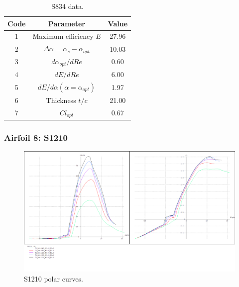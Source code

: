 \documentclass[../TFG_Annex.tex]{subfiles}
\begin{document}
\begin{table}[h!]
	\centering
	\begin{tabular}{c|c|c}
		Code & Parameter                                    & Value  \\ \hline
		1    & Maximum efficiency $E$                      &      27.96         \\
		2    & $\Delta \alpha=\alpha_{s}-\alpha_{opt}$    &           10.03          \\
		3    & ${d\alpha_{opt}}/{dRe}$                     &             0.60     \\
		4    & ${dE}/{dRe}$                                &        6.00           \\
		5    & ${dE}/{d \alpha} (\alpha=\alpha_{opt})$      &           1.97        \\
		6    & Thickness $t/c$                            &              21.00      \\
		7    & $Cl_{opt}$  &   0.67
	\end{tabular}
	\caption{S834 data.}
	\label{tab:Airf7}
\end{table}


\newpage
\subsubsection{Airfoil 8: S1210}

\begin{figure}[h!]
	\centering
	\includegraphics[width=1\linewidth]{"../../04-Airfoil selection/Imatges airfoils/8-S1210"}
	\caption{S1210 polar curves.}
	\label{fig:8-s1210}
\end{figure}
\end{document}
